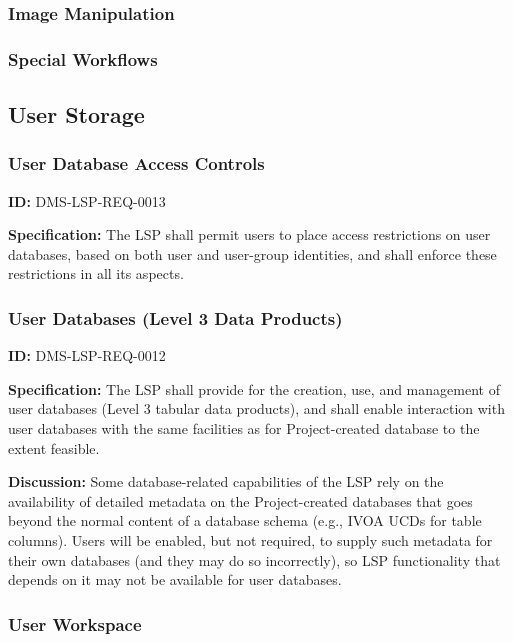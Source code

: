 \documentclass[SE,toc,lsstdraft]{lsstdoc}
\begin{document}
\subsubsection{Image Manipulation}

\subsubsection{Special Workflows}

\subsection{User Storage}

\subsubsection{User Database Access Controls}

\label{DMS-LSP-REQ-0013}
\textbf{ID:} DMS-LSP-REQ-0013

\textbf{Specification:}
The LSP shall permit users to place access restrictions on user databases, based on both user and user-group identities, and shall enforce these restrictions in all its aspects.

\subsubsection{User Databases (Level 3 Data Products)}

\label{DMS-LSP-REQ-0012}
\textbf{ID:} DMS-LSP-REQ-0012

\textbf{Specification:}
The LSP shall provide for the creation, use, and management of user databases (Level 3 tabular data products), and shall enable interaction with user databases with the same facilities as for Project-created database to the extent feasible.

\textbf{Discussion:}
Some database-related capabilities of the LSP rely on the availability of detailed metadata on the Project-created databases that goes beyond the normal content of a database schema (e.g., IVOA UCDs for table columns).  Users will be enabled, but not required, to supply such metadata for their own databases (and they may do so incorrectly), so LSP functionality that depends on it may not be available for user databases.

\subsubsection{User Workspace}
\end{document}
